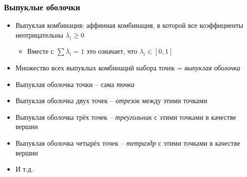 \documentclass[10pt]{beamer}
\begin{document}
\begin{frame}[fragile]
\frametitle{Выпуклые оболочки}
\begin{itemize}
\item Выпуклая комбинация: аффинная комбинация, в которой все коэффициенты неотрицательны \begin{math}\lambda_i \geq 0\end{math}
\pause
\begin{itemize}
\item Вместе с \begin{math}\sum\lambda_i = 1\end{math} это означает, что \begin{math}\lambda_i \in [0, 1]\end{math}
\end{itemize}
\pause
\item Множество всех выпуклых комбинаций набора точек = \textit{выпуклая оболочка}
\pause
\item Выпуклая оболочка точки -- сама \textit{точка}
\pause
\item Выпуклая оболочка двух точек -- \textit{отрезок} между этими точками
\pause
\item Выпуклая оболочка трёх точек -- \textit{треугольник} с этими точками в качестве вершин
\pause
\item Выпуклая оболочка четырёх точек -- \textit{тетраэдр} с этими точками в качестве вершин
\pause
\item И т.д.
\end{itemize}
\end{frame}
\end{document}
